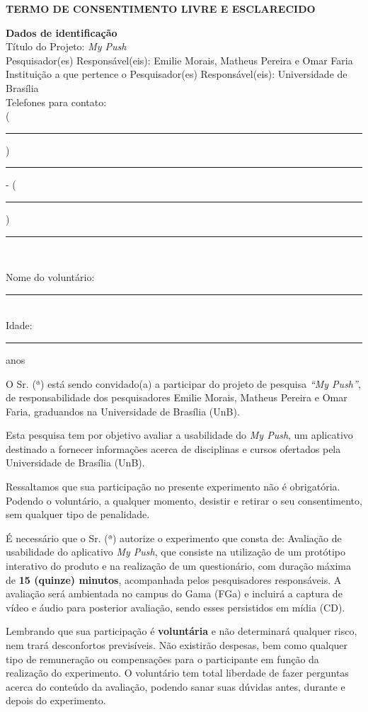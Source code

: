 \textbf{TERMO DE CONSENTIMENTO LIVRE E ESCLARECIDO}
\vspace{1cm}

{\raggedright
\textbf{Dados de identificação}\\
Título do Projeto: \textit{My Push}\\
Pesquisador(es) Responsável(eis): Emilie Morais, Matheus Pereira e Omar Faria\\
Instituição a que pertence o Pesquisador(es) Responsável(eis): Universidade de Brasília\\
Telefones para contato:\\
(\rule{1cm}{0.5pt})\rule{5cm}{0.5pt} - (\rule{1cm}{0.5pt})\rule{5cm}{0.5pt}\\

\vspace{1cm}

Nome do voluntário:\rule{12cm}{0.5pt}\\
Idade:\rule{1cm}{0.5pt} anos
}
 
\vspace{0.5cm}
O Sr. (ª) está sendo convidado(a) a participar do projeto de pesquisa \textit{“My Push”}, de responsabilidade dos pesquisadores Emilie Morais, Matheus Pereira e Omar Faria, graduandos na Universidade de Brasília (UnB).

Esta pesquisa tem por objetivo avaliar a usabilidade do \textit{My Push}, um aplicativo destinado a fornecer informações acerca de disciplinas e cursos ofertados pela Universidade de Brasília (UnB).

Ressaltamos que sua participação no presente experimento não é obrigatória. Podendo o voluntário, a qualquer momento, desistir e retirar o seu consentimento, sem qualquer tipo de penalidade.

É necessário que o Sr. (ª) autorize o experimento que consta de: Avaliação de usabilidade do aplicativo \textit{My Push}, que consiste na utilização de um protótipo interativo do produto e na realização de um questionário,
com duração máxima de \textbf{15 (quinze) minutos}, acompanhada pelos pesquisadores responsáveis. A avaliação será ambientada no campus do Gama (FGa) e incluirá a captura de vídeo e áudio para posterior avaliação, sendo esses
persistidos em mídia (CD).

Lembrando que sua participação é \textbf{voluntária} e não determinará qualquer risco, nem trará desconfortos previsíveis. Não existirão despesas, bem como qualquer tipo de remuneração ou compensações para o participante em função da 
realização do experimento. O voluntário tem total liberdade de fazer perguntas acerca do conteúdo da avaliação, podendo sanar suas dúvidas antes, durante e depois do experimento.

